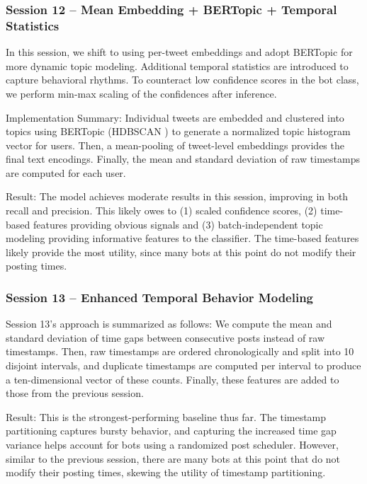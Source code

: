\documentclass[conference]{IEEEtran}
\begin{document}
\subsubsection{\textbf{Session 12} – Mean Embedding + BERTopic + Temporal Statistics}
In this session, we shift to using per-tweet embeddings and adopt 
BERTopic \citep{grootendorst2022bertopic} for more dynamic topic modeling. 
Additional temporal statistics are introduced to capture behavioral rhythms.
To counteract low confidence scores in the bot class, 
we perform min-max scaling of the confidences after inference.

Implementation Summary:
Individual tweets are embedded and clustered into topics
 using BERTopic (HDBSCAN \citep{mcinnes2017hdbscan}) to generate a normalized topic histogram vector for users. Then, a mean-pooling of tweet-level embeddings provides the final text encodings. Finally, the mean and standard deviation of raw timestamps are computed for each user.

Result:
The model achieves moderate results in this session, 
improving in both recall and precision.
This likely owes to (1) scaled confidence scores, 
(2) time-based features providing obvious signals 
and (3) batch-independent topic modeling
providing informative features to the classifier. 
The time-based features likely provide the most
utility, since many bots at this point do not modify their posting times.  

\subsubsection{\textbf{Session 13} – Enhanced Temporal Behavior Modeling}
Session 13's approach is summarized as follows:
We compute the mean and standard deviation of time gaps between consecutive posts instead of raw timestamps. Then,
raw timestamps are ordered chronologically and split into 10 disjoint intervals, and duplicate timestamps are computed per interval
to produce a ten-dimensional vector of these counts.
Finally, these features are added to those from the previous session.
    
Result:
This is the strongest-performing
baseline thus far. The timestamp partitioning captures bursty behavior, 
and capturing the increased time gap variance helps account for 
bots using a randomized post scheduler. However, 
similar to the previous session, there are many bots at this 
point that do not modify their posting times, skewing the utility of timestamp partitioning.
\end{document}

